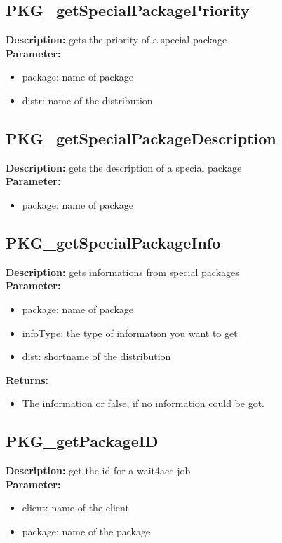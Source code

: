 \subsection{PKG\_getSpecialPackagePriority}
\textbf{Description:} gets the priority of a special package\\
\textbf{Parameter:}
\begin{itemize}
\item package: name of package
\item distr: name of the distribution
\end{itemize}

\subsection{PKG\_getSpecialPackageDescription}
\textbf{Description:} gets the description of a special package\\
\textbf{Parameter:}
\begin{itemize}
\item package: name of package
\end{itemize}

\subsection{PKG\_getSpecialPackageInfo}
\textbf{Description:} gets informations from special packages\\
\textbf{Parameter:}
\begin{itemize}
\item package: name of package
\item infoType: the type of information you want to get
\item dist: shortname of the distribution
\end{itemize}
\textbf{Returns:}
\begin{itemize}
\item The information or false, if no information could be got.
\end{itemize}

\subsection{PKG\_getPackageID}
\textbf{Description:} get the id for a wait4acc job\\
\textbf{Parameter:}
\begin{itemize}
\item client: name of the client
\item package: name of the package
\end{itemize}


